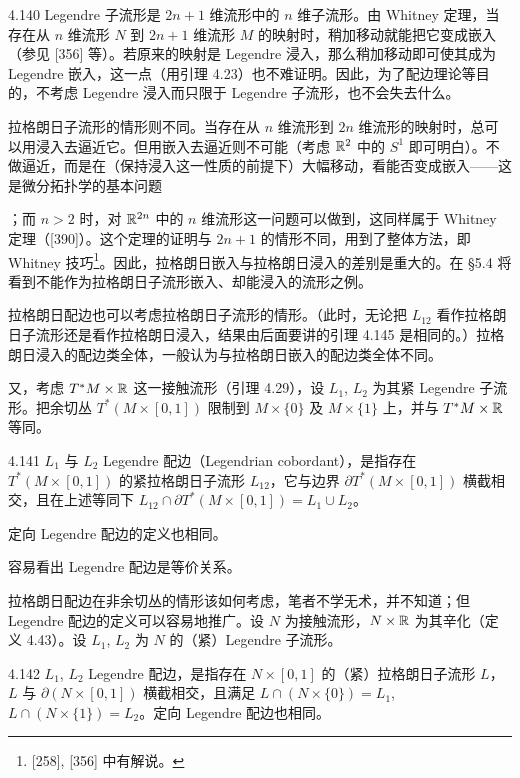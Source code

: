 \begin{remark}{4.140}
  Legendre 子流形是 $2n+1$ 维流形中的 $n$ 维子流形。由 Whitney 定理，当存在从 $n$ 维流形 $N$ 到 $2n+1$ 维流形 $M$ 的映射时，稍加移动就能把它变成嵌入（参见 [356] 等）。若原来的映射是 Legendre 浸入，那么稍加移动即可使其成为 Legendre 嵌入，这一点（用引理 4.23）也不难证明。因此，为了配边理论等目的，不考虑 Legendre 浸入而只限于 Legendre 子流形，也不会失去什么。

  拉格朗日子流形的情形则不同。当存在从 $n$ 维流形到 $2n$ 维流形的映射时，总可以用浸入去逼近它。但用嵌入去逼近则不可能（考虑 $\mathbb{R}^2$ 中的 $S^1$ 即可明白）。不做逼近，而是在（保持浸入这一性质的前提下）大幅移动，看能否变成嵌入——这是微分拓扑学的基本问题

；而 $n>2$ 时，对 $\mathbb{R}^{2n}$ 中的 $n$ 维流形这一问题可以做到，这同样属于 Whitney 定理（[390]）。这个定理的证明与 $2n+1$ 的情形不同，用到了整体方法，即 Whitney 技巧\footnote{[258], [356] 中有解说。}。因此，拉格朗日嵌入与拉格朗日浸入的差别是重大的。在 §5.4 将看到不能作为拉格朗日子流形嵌入、却能浸入的流形之例。
\end{remark}

拉格朗日配边也可以考虑拉格朗日子流形的情形。（此时，无论把 $L_{12}$ 看作拉格朗日子流形还是看作拉格朗日浸入，结果由后面要讲的引理 4.145 是相同的。）拉格朗日浸入的配边类全体，一般认为与拉格朗日嵌入的配边类全体不同。

又，考虑 $T^*M\times\mathbb{R}$ 这一接触流形（引理 4.29），设 $L_1$, $L_2$ 为其紧 Legendre 子流形。把余切丛 $T^*(M\times[0,1])$ 限制到 $M\times\{0\}$ 及 $M\times\{1\}$ 上，并与 $T^*M\times\mathbb{R}$ 等同。

\begin{definition}{4.141}
  $L_1$ 与 $L_2$ Legendre 配边（Legendrian cobordant），是指存在 $T^*(M\times[0,1])$ 的紧拉格朗日子流形 $L_{12}$，它与边界 $\partial T^*(M\times[0,1])$ 横截相交，且在上述等同下 $L_{12}\cap\partial T^*(M\times[0,1])=L_1\cup L_2$。

  定向 Legendre 配边的定义也相同。
\end{definition}

容易看出 Legendre 配边是等价关系。

拉格朗日配边在非余切丛的情形该如何考虑，笔者不学无术，并不知道；但 Legendre 配边的定义可以容易地推广。设 $N$ 为接触流形，$N\times\mathbb{R}$ 为其辛化（定义 4.43）。设 $L_1$, $L_2$ 为 $N$ 的（紧）Legendre 子流形。

\begin{definition}{4.142}
  $L_1$, $L_2$ Legendre 配边，是指存在 $N\times[0,1]$ 的（紧）拉格朗日子流形 $L$，$L$ 与 $\partial(N\times[0,1])$ 横截相交，且满足 $L\cap(N\times\{0\})=L_1$, $L\cap(N\times\{1\})=L_2$。定向 Legendre 配边也相同。
\end{definition}

